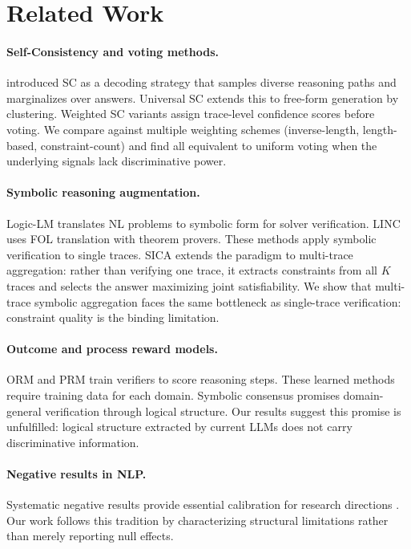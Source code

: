 \documentclass[11pt,a4paper]{article}
\begin{document}
\section{Related Work}

\paragraph{Self-Consistency and voting methods.}
\citet{wang2023selfconsistency} introduced SC as a decoding strategy that samples diverse reasoning paths and marginalizes over answers. Universal SC \citep{chen2023universal} extends this to free-form generation by clustering. Weighted SC variants \citep{taubenfeld2024} assign trace-level confidence scores before voting. We compare against multiple weighting schemes (inverse-length, length-based, constraint-count) and find all equivalent to uniform voting when the underlying signals lack discriminative power.

\paragraph{Symbolic reasoning augmentation.}
Logic-LM \citep{pan2023logiclm} translates NL problems to symbolic form for solver verification. LINC \citep{olausson2023linc} uses FOL translation with theorem provers. These methods apply symbolic verification to single traces. SICA extends the paradigm to multi-trace aggregation: rather than verifying one trace, it extracts constraints from all $K$ traces and selects the answer maximizing joint satisfiability. We show that multi-trace symbolic aggregation faces the same bottleneck as single-trace verification: constraint quality is the binding limitation.

\paragraph{Outcome and process reward models.}
ORM \citep{cobbe2021gsm8k} and PRM \citep{lightman2023lets} train verifiers to score reasoning steps. These learned methods require training data for each domain. Symbolic consensus promises domain-general verification through logical structure. Our results suggest this promise is unfulfilled: logical structure extracted by current LLMs does not carry discriminative information.

\paragraph{Negative results in NLP.}
Systematic negative results provide essential calibration for research directions \citep{rogers2020primer}. Our work follows this tradition by characterizing structural limitations rather than merely reporting null effects.
\end{document}
